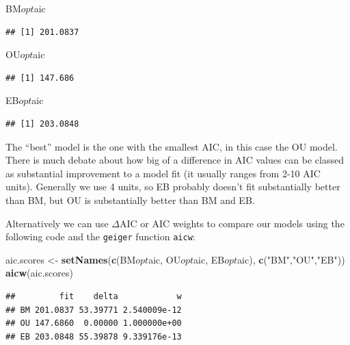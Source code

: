 \documentclass[]{book}
\newenvironment{Shaded}{\begin{snugshade}}{\end{snugshade}}
\newcommand{\KeywordTok}[1]{\textcolor[rgb]{0.13,0.29,0.53}{\textbf{{#1}}}}
\newcommand{\StringTok}[1]{\textcolor[rgb]{0.31,0.60,0.02}{{#1}}}
\newcommand{\NormalTok}[1]{{#1}}
\theoremstyle{definition}
\theoremstyle{definition}
\theoremstyle{definition}
\theoremstyle{remark}
\begin{document}
\begin{Shaded}
\begin{Highlighting}[]
\NormalTok{BM$opt$aic}
\end{Highlighting}
\end{Shaded}

\begin{verbatim}
## [1] 201.0837
\end{verbatim}

\begin{Shaded}
\begin{Highlighting}[]
\NormalTok{OU$opt$aic}
\end{Highlighting}
\end{Shaded}

\begin{verbatim}
## [1] 147.686
\end{verbatim}

\begin{Shaded}
\begin{Highlighting}[]
\NormalTok{EB$opt$aic}
\end{Highlighting}
\end{Shaded}

\begin{verbatim}
## [1] 203.0848
\end{verbatim}

The ``best'' model is the one with the smallest AIC, in this case the OU
model. There is much debate about how big of a difference in AIC values
can be classed as substantial improvement to a model fit (it usually
ranges from 2-10 AIC units). Generally we use 4 units, so EB probably
doesn't fit substantially better than BM, but OU is substantially better
than BM and EB.

Alternatively we can use \(\Delta\)AIC or AIC weights to compare our
models using the following code and the \texttt{geiger} function
\texttt{aicw}:

\begin{Shaded}
\begin{Highlighting}[]
\NormalTok{aic.scores <-}\StringTok{ }\KeywordTok{setNames}\NormalTok{(}\KeywordTok{c}\NormalTok{(BM$opt$aic, OU$opt$aic, EB$opt$aic), }\KeywordTok{c}\NormalTok{(}\StringTok{"BM"}\NormalTok{,}\StringTok{"OU"}\NormalTok{,}\StringTok{"EB"}\NormalTok{))}
\KeywordTok{aicw}\NormalTok{(aic.scores)}
\end{Highlighting}
\end{Shaded}

\begin{verbatim}
##         fit    delta            w
## BM 201.0837 53.39771 2.540009e-12
## OU 147.6860  0.00000 1.000000e+00
## EB 203.0848 55.39878 9.339176e-13
\end{verbatim}
\end{document}
